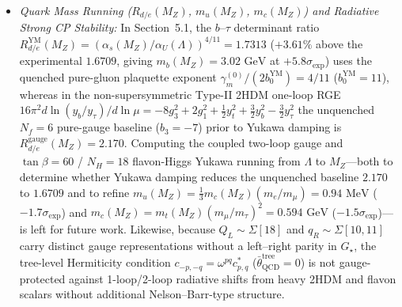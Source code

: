\documentclass[11pt,a4paper]{article}
\theoremstyle{definition}
\theoremstyle{remark}
\newcommand{\Gstar}{G_\star}
\begin{document}
\begin{enumerate}
\begin{itemize}
        \item \emph{Quark Mass Running ($R_{d/e}(M_Z)$, $m_u(M_Z)$, $m_c(M_Z)$) and Radiative Strong CP Stability:} In Section~5.1, the $b\text{--}\tau$ determinant ratio $R_{d/e}^{\mathrm{YM}}(M_Z) = (\alpha_s(M_Z)/\alpha_U(\Lambda))^{4/11} = 1.7313$ ($+3.61\%$ above the experimental $1.6709$, giving $m_b(M_Z) = 3.02\text{ GeV}$ at $+5.8\sigma_{\mathrm{exp}}$) uses the quenched pure-gluon plaquette exponent $\gamma_m^{(0)}/(2b_0^{\mathrm{YM}}) = 4/11$ ($b_0^{\mathrm{YM}} = 11$), whereas in the non-supersymmetric Type-II 2HDM one-loop RGE $16\pi^2 d\ln(y_b/y_\tau)/d\ln\mu = -8g_3^2 + 2g_1^2 + \frac{1}{2}y_t^2 + \frac{3}{2}y_b^2 - \frac{3}{2}y_\tau^2$ the unquenched $N_f = 6$ pure-gauge baseline ($b_3 = -7$) prior to Yukawa damping is $R_{d/e}^{\mathrm{gauge}}(M_Z) = 2.170$. Computing the coupled two-loop gauge and $\tan\beta = 60$ / $N_H = 18$ flavon-Higgs Yukawa running from $\Lambda$ to $M_Z$---both to determine whether Yukawa damping reduces the unquenched baseline $2.170$ to $1.6709$ and to refine $m_u(M_Z) = \frac{1}{3}m_c(M_Z)(m_e/m_\mu) = 0.94\text{ MeV}$ ($-1.7\sigma_{\mathrm{exp}}$) and $m_c(M_Z) = m_t(M_Z)(m_\mu/m_\tau)^2 = 0.594\text{ GeV}$ ($-1.5\sigma_{\mathrm{exp}}$)---is left for future work. Likewise, because $Q_L \sim \Sigma[18]$ and $q_R \sim \Sigma[10,11]$ carry distinct gauge representations without a left--right parity in $\Gstar$, the tree-level Hermiticity condition $c_{-p,-q} = \omega^{pq} c_{p,q}^*$ ($\bar{\theta}_{\mathrm{QCD}}^{\mathrm{tree}} = 0$) is not gauge-protected against 1-loop/2-loop radiative shifts from heavy 2HDM and flavon scalars without additional Nelson--Barr-type structure.
    \end{itemize}


\end{enumerate}
\end{document}
